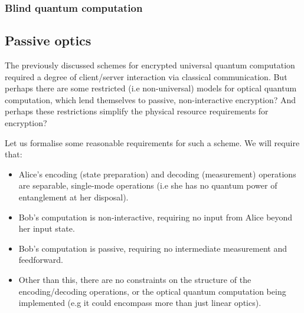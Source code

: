 
%
%

\subsubsection{Blind quantum computation} 


%
%

\subsection{Passive optics} 

The previously discussed schemes for encrypted universal quantum computation required a degree of client/server interaction via classical communication. But perhaps there are some restricted (i.e non-universal) models for optical quantum computation, which lend themselves to passive, non-interactive encryption? And perhaps these restrictions simplify the physical resource requirements for encryption?

Let us formalise some reasonable requirements for such a scheme. We will require that:
\begin{itemize}
\item Alice's encoding (state preparation) and decoding (measurement) operations are separable, single-mode operations (i.e she has no quantum power of entanglement at her disposal).
\item Bob's computation is non-interactive, requiring no input from Alice beyond her input state.
\item Bob's computation is passive, requiring no intermediate measurement and feedforward.
\item Other than this, there are no constraints on the structure of the encoding/decoding operations, or the optical quantum computation being implemented (e.g it could encompass more than just linear optics).
\end{itemize}

